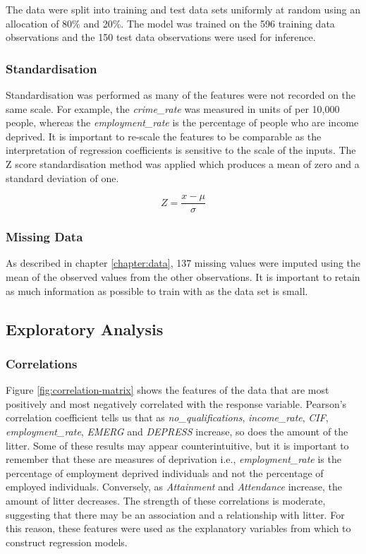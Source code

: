 \documentclass{thesis}
\begin{document}
The data were split into training and test data sets uniformly at random using an allocation of 80\% and 20\%. The model was trained on the 596 training data observations and the 150 test data observations were used for inference.

\subsubsection{Standardisation} 

Standardisation was performed as many of the features were not recorded on the same scale. For example, the \textit{crime\_rate} was measured in units of per 10,000 people, whereas the \textit{employment\_rate} is the percentage of people who are income deprived. It is important to re-scale the features to be comparable as the interpretation of regression coefficients is sensitive to the scale of the inputs. The Z score standardisation method was applied which produces a mean of zero and a standard deviation of one.

\begin{equation}
    Z = \frac{x - \mu}{\sigma}
\end{equation}

\subsubsection{Missing Data} 

As described in chapter \ref{chapter:data}, 137 missing values were imputed using the mean of the observed values from the other observations. It is important to retain as much information as possible to train with as the data set is small.

\subsection{Exploratory Analysis}

\subsubsection{Correlations}

Figure \ref{fig:correlation-matrix} shows the features of the data that are most positively and most negatively correlated with the response variable. Pearson's correlation coefficient tells us that as \textit{no\_qualifications}, \textit{income\_rate}, \textit{CIF}, \textit{employment\_rate}, \textit{EMERG} and \textit{DEPRESS} increase, so does the amount of the litter. Some of these results may appear counterintuitive, but it is important to remember that these are measures of deprivation i.e., \textit{employment\_rate} is the percentage of employment deprived individuals and not the percentage of employed individuals. Conversely, as \textit{Attainment} and \textit{Attendance} increase, the amount of litter decreases. The strength of these correlations is moderate, suggesting that there may be an association and a relationship with litter. For this reason, these features were used as the explanatory variables from which to construct regression models.
\end{document}
